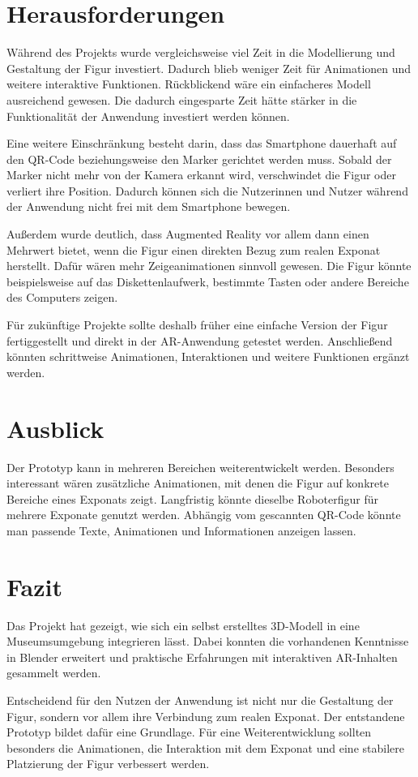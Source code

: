 \section{Herausforderungen}

Während des Projekts wurde vergleichsweise viel Zeit in die Modellierung und Gestaltung der Figur investiert. Dadurch blieb weniger Zeit für Animationen und weitere interaktive Funktionen. Rückblickend wäre ein einfacheres Modell ausreichend gewesen. Die dadurch eingesparte Zeit hätte stärker in die Funktionalität der Anwendung investiert werden können.

Eine weitere Einschränkung besteht darin, dass das Smartphone dauerhaft auf den QR-Code beziehungsweise den Marker gerichtet werden muss. Sobald der Marker nicht mehr von der Kamera erkannt wird, verschwindet die Figur oder verliert ihre Position. Dadurch können sich die Nutzerinnen und Nutzer während der Anwendung nicht frei mit dem Smartphone bewegen.

Außerdem wurde deutlich, dass Augmented Reality vor allem dann einen Mehrwert bietet, wenn die Figur einen direkten Bezug zum realen Exponat herstellt. Dafür wären mehr Zeigeanimationen sinnvoll gewesen. Die Figur könnte beispielsweise auf das Diskettenlaufwerk, bestimmte Tasten oder andere Bereiche des Computers zeigen.

Für zukünftige Projekte sollte deshalb früher eine einfache Version der Figur fertiggestellt und direkt in der AR-Anwendung getestet werden. Anschließend könnten schrittweise Animationen, Interaktionen und weitere Funktionen ergänzt werden.

\section{Ausblick}

Der Prototyp kann in mehreren Bereichen weiterentwickelt werden. Besonders interessant wären zusätzliche Animationen, mit denen die Figur auf konkrete Bereiche eines Exponats zeigt. Langfristig könnte dieselbe Roboterfigur für mehrere Exponate genutzt werden. Abhängig vom gescannten QR-Code könnte man passende Texte, Animationen und Informationen anzeigen lassen.

\section{Fazit}

Das Projekt hat gezeigt, wie sich ein selbst erstelltes 3D-Modell in eine Museumsumgebung integrieren lässt. Dabei konnten die vorhandenen Kenntnisse in Blender erweitert und praktische Erfahrungen mit interaktiven AR-Inhalten gesammelt werden.

Entscheidend für den Nutzen der Anwendung ist nicht nur die Gestaltung der Figur, sondern vor allem ihre Verbindung zum realen Exponat. Der entstandene Prototyp bildet dafür eine Grundlage. Für eine Weiterentwicklung sollten besonders die Animationen, die Interaktion mit dem Exponat und eine stabilere Platzierung der Figur verbessert werden.